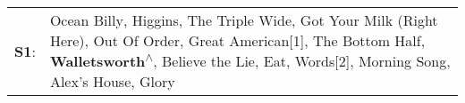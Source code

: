 \begin{supertabular}{p{0.03\textwidth}p{0.92\textwidth}}
 \textbf{S1}:  &  Ocean Billy\textsuperscript{}, \enspace Higgins\textsuperscript{}, \enspace The Triple Wide\textsuperscript{}, \enspace Got Your Milk (Right Here)\textsuperscript{}, \enspace Out Of Order\textsuperscript{}, \enspace Great American[1]\textsuperscript{}, \enspace The Bottom Half\textsuperscript{}, \enspace \textbf{Walletsworth\textsuperscript{$\wedge$}}, \enspace Believe the Lie\textsuperscript{}, \enspace Eat\textsuperscript{}, \enspace Words[2]\textsuperscript{}, \enspace Morning Song\textsuperscript{}, \enspace Alex's House\textsuperscript{}, \enspace Glory\textsuperscript{}  \enspace  \\
\end{supertabular}
